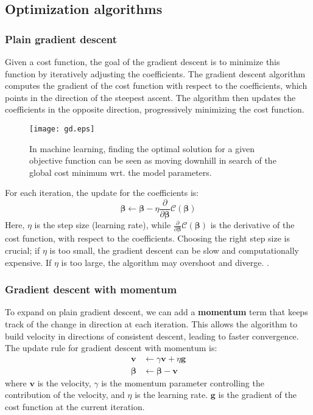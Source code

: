 \documentclass{article}
\begin{document}
\begin{multicols}{2}
\section*{Optimization algorithms}
\subsubsection*{Plain gradient descent}
\noindent Given a cost function, the goal of the gradient descent is to minimize this function by iteratively adjusting the coefficients. The gradient descent algorithm computes the gradient of the cost function with respect to the coefficients, which points in the direction of the steepest ascent. The algorithm then updates the coefficients in the opposite direction, progressively minimizing the cost function.
\begin{figure}[H]
    \centering
    \texttt{[image: gd.eps]} %
    \caption{In machine learning, finding the optimal solution for a given objective function can be seen as moving downhill in search of the global cost minimum wrt. the model parameters. \cite{deisenroth_mathematics_2020}}
    \label{fig:gd_fig}
\end{figure}
For each iteration, the update for the coefficients is:
$$\bm{\beta} \leftarrow \bm{\beta} - \eta \frac{\partial}{\partial \bm{\beta}} \mathcal{C}(\bm{\beta})$$
Here, $\eta$ is the step size (learning rate), while $\frac{\partial}{\partial \bm{\beta}}\mathcal{C}(\bm{\beta})$ is the derivative of the cost function, with respect to the coefficients. Choosing the right step size is crucial; if $\eta$ is too small, the gradient descent can be slow and computationally expensive. If $\eta$ is too large, the algorithm may overshoot and diverge. \cite{deisenroth_mathematics_2020}.

\subsubsection*{Gradient descent with momentum}
To expand on plain gradient descent, we can add a \textbf{momentum} term that keeps track of the change in direction at each iteration. This allows the algorithm to build velocity in directions of consistent descent, leading to faster convergence. The update rule for gradient descent with momentum is:
\begin{align*}
\bm{v} &\leftarrow  \gamma \bm{v} + \eta \bm{g}\\
\bm{\beta} &\leftarrow \bm{\beta} - \bm{v}
\end{align*} where $\bm{v}$ is the velocity, $\gamma$ is the momentum parameter controlling the contribution of the velocity, and $\eta$ is the learning rate.
$\bm{g}$ is the gradient of the cost function at the current iteration. \cite{deisenroth_mathematics_2020}


\end{multicols}
\end{document}
